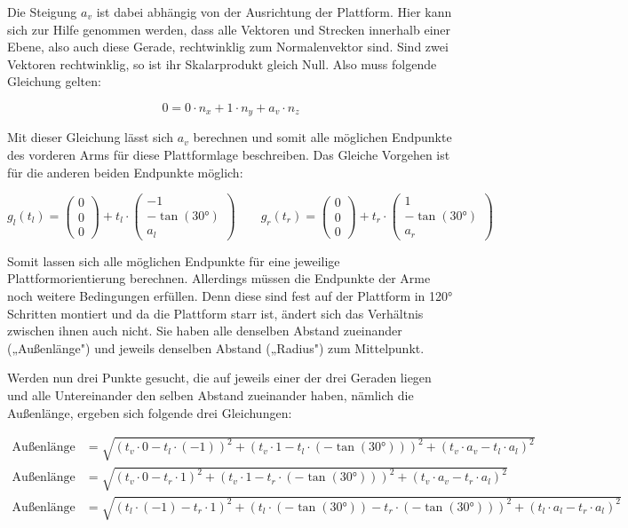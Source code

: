 \documentclass[11pt, a4paper]{scrreprt}
\begin{document}
Die Steigung $a_v$ ist dabei abhängig von der Ausrichtung der Plattform. Hier kann sich zur Hilfe
genommen werden, dass alle Vektoren und Strecken innerhalb einer Ebene, also auch diese
Gerade, rechtwinklig zum Normalenvektor sind. Sind zwei Vektoren rechtwinklig, so ist ihr
Skalarprodukt gleich Null. Also muss folgende Gleichung gelten:

\[
  0 = 0 \cdot n_x + 1 \cdot n_y + a_v \cdot n_z
\]

Mit dieser Gleichung lässt sich $a_v$ berechnen und somit alle möglichen Endpunkte des vorderen
Arms für diese Plattformlage beschreiben. Das Gleiche Vorgehen ist für die anderen beiden
Endpunkte möglich:

\[
  g_l(t_l) = \begin{pmatrix} 0 \\ 0 \\ 0 \end{pmatrix} + t_l \cdot \begin{pmatrix} -1 \\ -\tan(30°) \\ a_l \end{pmatrix}
  \qquad
  g_r(t_r) = \begin{pmatrix} 0 \\ 0 \\ 0 \end{pmatrix} + t_r \cdot \begin{pmatrix} 1 \\ -\tan(30°) \\ a_r \end{pmatrix}
\]

Somit lassen sich alle möglichen Endpunkte für eine jeweilige Plattformorientierung berechnen.
Allerdings müssen die Endpunkte der Arme noch weitere Bedingungen erfüllen. Denn diese sind
fest auf der Plattform in 120° Schritten montiert und da die Plattform starr ist, ändert sich das
Verhältnis zwischen ihnen auch nicht. Sie haben alle denselben Abstand zueinander
(„Außenlänge") und jeweils denselben Abstand („Radius") zum Mittelpunkt.

Werden nun drei Punkte gesucht, die auf jeweils einer der drei Geraden liegen und alle
Untereinander den selben Abstand zueinander haben, nämlich die Außenlänge, ergeben sich
folgende drei Gleichungen:

\begin{align*}
  \text{Außenlänge} &= \sqrt{(t_v \cdot 0 - t_l \cdot (-1))^2 + (t_v \cdot 1 - t_l \cdot (-\tan(30°)))^2 + (t_v \cdot a_v - t_l \cdot a_l)^2} \\[4pt]
  \text{Außenlänge} &= \sqrt{(t_v \cdot 0 - t_r \cdot 1)^2 + (t_v \cdot 1 - t_r \cdot (-\tan(30°)))^2 + (t_v \cdot a_v - t_r \cdot a_l)^2} \\[4pt]
  \text{Außenlänge} &= \sqrt{(t_l \cdot (-1) - t_r \cdot 1)^2 + (t_l \cdot (-\tan(30°)) - t_r \cdot (-\tan(30°)))^2 + (t_l \cdot a_l - t_r \cdot a_l)^2}
\end{align*}
\end{document}
